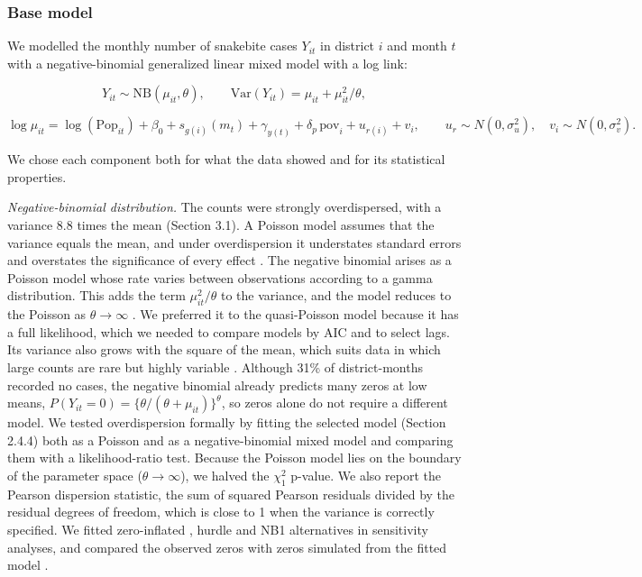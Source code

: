 \documentclass[11pt,a4paper]{article}
\begin{document}
\subsubsection{Base model}

We modelled the monthly number of snakebite cases \(Y_{it}\) in district \(i\) and month \(t\) with a negative-binomial generalized linear mixed model with a log link:

\[Y_{it} \sim \mathrm{NB}(\mu_{it}, \theta), \qquad \mathrm{Var}(Y_{it}) = \mu_{it} + \mu_{it}^2/\theta,\]

\[\log \mu_{it} = \log(\text{Pop}_{it}) + \beta_0 + s_{g(i)}(m_t) + \gamma_{y(t)} + \delta_p\,\text{pov}_i + u_{r(i)} + v_i, \qquad u_r \sim N(0,\sigma_u^2), \quad v_i \sim N(0,\sigma_v^2).\]

We chose each component both for what the data showed and for its statistical properties.

\emph{Negative-binomial distribution.} The counts were strongly overdispersed, with a variance 8.8 times the mean (Section 3.1). A Poisson model assumes that the variance equals the mean, and under overdispersion it understates standard errors and overstates the significance of every effect \cite{ref26}. The negative binomial arises as a Poisson model whose rate varies between observations according to a gamma distribution. This adds the term \(\mu_{it}^2/\theta\) to the variance, and the model reduces to the Poisson as \(\theta \to \infty\) \cite{ref26}. We preferred it to the quasi-Poisson model because it has a full likelihood, which we needed to compare models by AIC and to select lags. Its variance also grows with the square of the mean, which suits data in which large counts are rare but highly variable \cite{ref27}. Although 31\% of district-months recorded no cases, the negative binomial already predicts many zeros at low means, \(P(Y_{it}=0) = \lbrace \theta/(\theta+\mu_{it})\rbrace^{\theta}\), so zeros alone do not require a different model. We tested overdispersion formally by fitting the selected model (Section 2.4.4) both as a Poisson and as a negative-binomial mixed model and comparing them with a likelihood-ratio test. Because the Poisson model lies on the boundary of the parameter space (\(\theta \to \infty\)), we halved the \(\chi^2_1\) p-value. We also report the Pearson dispersion statistic, the sum of squared Pearson residuals divided by the residual degrees of freedom, which is close to 1 when the variance is correctly specified. We fitted zero-inflated \cite{ref28}, hurdle \cite{ref26} and NB1 alternatives in sensitivity analyses, and compared the observed zeros with zeros simulated from the fitted model \cite{ref29}.
\end{document}
